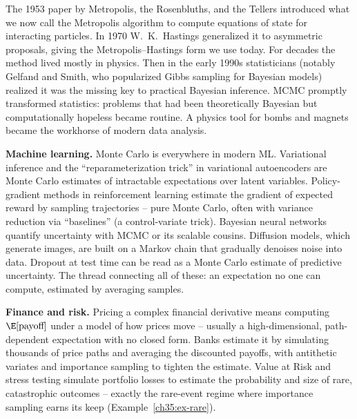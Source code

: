 \begin{historybox}
The 1953 paper by Metropolis, the Rosenbluths, and the Tellers introduced what we
now call the Metropolis algorithm to compute equations of state for interacting
particles. In 1970 W.\ K.\ Hastings generalized it to asymmetric proposals,
giving the Metropolis--Hastings form we use today. For decades the method lived
mostly in physics. Then in the early 1990s statisticians (notably Gelfand and
Smith, who popularized Gibbs sampling for Bayesian models) realized it was the
missing key to practical Bayesian inference. MCMC promptly transformed statistics:
problems that had been theoretically Bayesian but computationally hopeless became
routine. A physics tool for bombs and magnets became the workhorse of modern data
analysis.
\end{historybox}

\begin{applicationbox}
\textbf{Machine learning.} Monte Carlo is everywhere in modern ML. Variational
inference and the ``reparameterization trick'' in variational autoencoders are
Monte Carlo estimates of intractable expectations over latent variables.
Policy-gradient methods in reinforcement learning estimate the gradient of
expected reward by sampling trajectories -- pure Monte Carlo, often with variance
reduction via ``baselines'' (a control-variate trick). Bayesian neural networks
quantify uncertainty with MCMC or its scalable cousins. Diffusion models, which
generate images, are built on a Markov chain that gradually denoises noise into
data. Dropout at test time can be read as a Monte Carlo estimate of predictive
uncertainty. The thread connecting all of these: an expectation no one can
compute, estimated by averaging samples.
\end{applicationbox}

\begin{applicationbox}
\textbf{Finance and risk.} Pricing a complex financial derivative means computing
$\E[\text{payoff}]$ under a model of how prices move -- usually a
high-dimensional, path-dependent expectation with no closed form. Banks estimate
it by simulating thousands of price paths and averaging the discounted payoffs,
with antithetic variates and importance sampling to tighten the estimate. Value
at Risk and stress testing simulate portfolio losses to estimate the probability
and size of rare, catastrophic outcomes -- exactly the rare-event regime where
importance sampling earns its keep (Example~\ref{ch35:ex-rare}).
\end{applicationbox}

